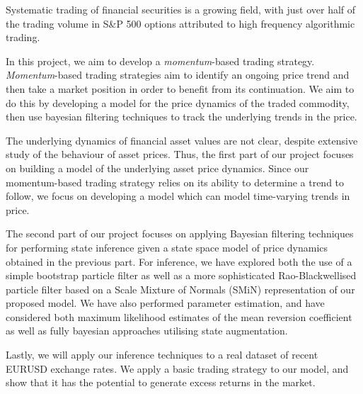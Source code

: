\documentclass[../main.tex]{subfiles}
\begin{document}
Systematic trading of financial securities is a growing field, with just over half of the trading volume in S\&P 500 options attributed to high frequency algorithmic trading. 

In this project, we aim to develop a \textit{momentum}-based trading strategy. \textit{Momentum}-based trading strategies aim to identify an ongoing price trend and then take a market position in order to benefit from its continuation. We aim to do this by developing a model for the price dynamics of the traded commodity, then use bayesian filtering techniques to track the underlying trends in the price.

The underlying dynamics of financial asset values are not clear, despite extensive study of the behaviour of asset prices. Thus, the first part of our project focuses on building a model of the underlying asset price dynamics. Since our momentum-based trading strategy relies on its ability to determine a trend to follow, we focus on developing a model which can model time-varying trends in price. 

The second part of our project focuses on applying Bayesian filtering techniques for performing state inference given a state space model of price dynamics obtained in the previous part. For inference, we have explored both the use of a simple bootstrap particle filter as well as a more sophisticated Rao-Blackwellised particle filter based on a Scale Mixture of Normals (SMiN) representation of our proposed model. We have also performed parameter estimation, and have considered both maximum likelihood estimates of the mean reversion coefficient as well as fully bayesian approaches utilising state augmentation.

Lastly, we will apply our inference techniques to a real dataset of recent EURUSD exchange rates. We apply a basic trading strategy to our model, and show that it has the potential to generate excess returns in the market.
\end{document}
